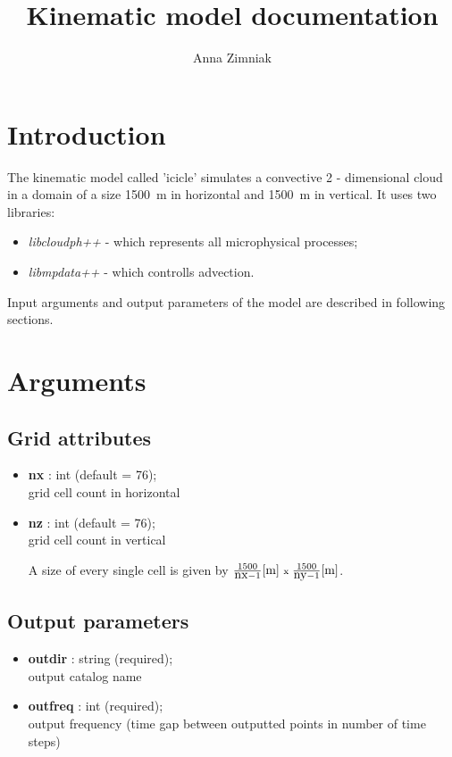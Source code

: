 \documentclass[11pt]{article}
\author{Anna Zimniak}
\affil{Institute of Geophysics, Faculty of Physics, University of Warsaw, Poland}
\title{Kinematic model documentation}
\begin{document}
\maketitle

\section{Introduction}

The kinematic model called 'icicle' simulates a convective 2 - dimensional cloud in a domain of a size 1500~m in horizontal and 1500~m in vertical. It uses two libraries:
\begin{itemize}
	\item \textit{libcloudph++} - which represents all microphysical processes;
	\item \textit{libmpdata++} - which controlls advection.
\end{itemize}

Input arguments and output parameters of the model are described in following sections.

\section{Arguments}

\subsection{Grid attributes}

\begin{itemize}
\item \textbf{nx} : int (default = 76);\\ grid cell count in horizontal
\item \textbf{nz} : int (default = 76);\\ grid cell count in vertical

A size of every single cell is given by $\frac{1500}{\mbox{nx}-1}\mbox{[m]  \scriptsize{x} }\frac{1500}{\mbox{ny}-1} \mbox{[m]}$.
\end{itemize}

\subsection{Output parameters}

\begin{itemize}
  \item \textbf{outdir} : string (required); \\ output catalog name
  \item \textbf{outfreq} : int (required); \\ output frequency (time gap between outputted points in number of time steps)
\end{itemize}
\end{document}

